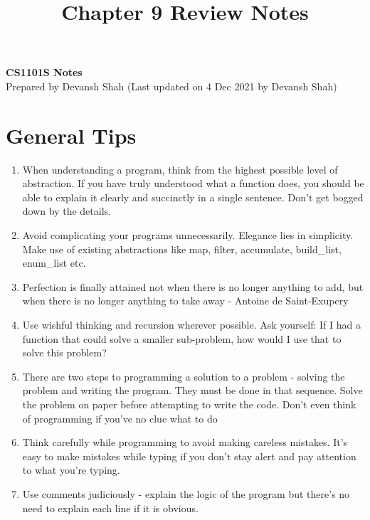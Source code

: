\documentclass[11pt]{article}
\theoremstyle{definition}
\begin{document}
\renewcommand{\labelenumii}{\arabic{enumi}.\arabic{enumii}}
\renewcommand{\labelenumiii}{\arabic{enumi}.\arabic{enumii}.\arabic{enumiii}}
\renewcommand{\labelenumiv}{\arabic{enumi}.\arabic{enumii}.\arabic{enumiii}.\arabic{enumiv}}
\setcounter{section}{0}
\title{Chapter 9 Review Notes}
\newcommand{\code}{\fontfamily{pcr}\selectfont}
\thispagestyle{empty}

\begin{center}
{\LARGE \bf CS1101S Notes}\\
Prepared by Devansh Shah (Last updated on 4 Dec 2021 by Devansh Shah)
\end{center}
\tableofcontents
\pagebreak
\section{General Tips}
\begin{enumerate}
    \item When understanding a program, think from the highest possible level of abstraction. If you have truly understood what a function does, you should be able to explain it clearly and succinctly in a single sentence. Don't get bogged down by the details.
    \item Avoid complicating your programs unnecessarily. Elegance lies in simplicity. Make use of existing abstractions like map, filter, accumulate, build\_list, enum\_list etc.
    \item Perfection is finally attained not when there is no longer anything to add, but when there is no longer anything to take away - Antoine de Saint-Exupery
    \item Use wishful thinking and recursion wherever possible. Ask yourself: If I had a function that could solve a smaller sub-problem, how would I use that to solve this problem?
    \item There are two steps to programming a solution to a problem - solving the problem and writing the program. They must be done in that sequence. Solve the problem on paper before attempting to write the code. Don't even think of programming if you've no clue what to do
    \item Think carefully while programming to avoid making careless mistakes. It's easy to make mistakes while typing if you don't stay alert and pay attention to what you're typing.
    \item Use comments judiciously - explain the logic of the program but there's no need to explain each line if it is obvious.
\end{enumerate}
\end{document}
